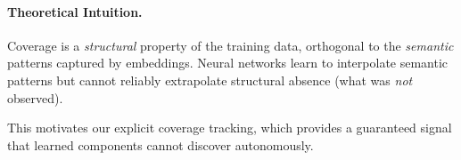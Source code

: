 \paragraph{Theoretical Intuition.}
Coverage is a \emph{structural} property of the training data, orthogonal to the \emph{semantic} patterns captured by embeddings. Neural networks learn to interpolate semantic patterns but cannot reliably extrapolate structural absence (what was \emph{not} observed).

This motivates our explicit coverage tracking, which provides a guaranteed signal that learned components cannot discover autonomously.
